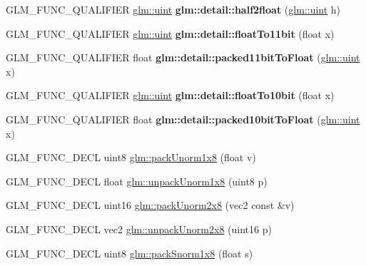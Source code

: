 \begin{DoxyCompactItemize}
G\+L\+M\+\_\+\+F\+U\+N\+C\+\_\+\+Q\+U\+A\+L\+I\+F\+I\+ER \hyperlink{group__core__precision_ga4fd29415871152bfb5abd588334147c8}{glm\+::uint} {\bfseries glm\+::detail\+::half2float} (\hyperlink{group__core__precision_ga4fd29415871152bfb5abd588334147c8}{glm\+::uint} h)
\item 
\mbox{\label{packing_8inl_a62edbdbe89fe6282dd7909e6e4703796}} 
G\+L\+M\+\_\+\+F\+U\+N\+C\+\_\+\+Q\+U\+A\+L\+I\+F\+I\+ER \hyperlink{group__core__precision_ga4fd29415871152bfb5abd588334147c8}{glm\+::uint} {\bfseries glm\+::detail\+::float\+To11bit} (float x)
\item 
\mbox{\label{packing_8inl_a0148d59bbb6dbf6c0f296e73a527c225}} 
G\+L\+M\+\_\+\+F\+U\+N\+C\+\_\+\+Q\+U\+A\+L\+I\+F\+I\+ER float {\bfseries glm\+::detail\+::packed11bit\+To\+Float} (\hyperlink{group__core__precision_ga4fd29415871152bfb5abd588334147c8}{glm\+::uint} x)
\item 
\mbox{\label{packing_8inl_a2be3138712a0811602a183614221ad5c}} 
G\+L\+M\+\_\+\+F\+U\+N\+C\+\_\+\+Q\+U\+A\+L\+I\+F\+I\+ER \hyperlink{group__core__precision_ga4fd29415871152bfb5abd588334147c8}{glm\+::uint} {\bfseries glm\+::detail\+::float\+To10bit} (float x)
\item 
\mbox{\label{packing_8inl_afddea7fa02b61b01129777a21380edf4}} 
G\+L\+M\+\_\+\+F\+U\+N\+C\+\_\+\+Q\+U\+A\+L\+I\+F\+I\+ER float {\bfseries glm\+::detail\+::packed10bit\+To\+Float} (\hyperlink{group__core__precision_ga4fd29415871152bfb5abd588334147c8}{glm\+::uint} x)
\item 
G\+L\+M\+\_\+\+F\+U\+N\+C\+\_\+\+D\+E\+CL uint8 \hyperlink{group__gtc__packing_ga2f9963e5d762b10085b280d3662017ba}{glm\+::pack\+Unorm1x8} (float v)
\item 
G\+L\+M\+\_\+\+F\+U\+N\+C\+\_\+\+D\+E\+CL float \hyperlink{group__gtc__packing_ga32f3f2642df2ea87449d59fb614a8305}{glm\+::unpack\+Unorm1x8} (uint8 p)
\item 
G\+L\+M\+\_\+\+F\+U\+N\+C\+\_\+\+D\+E\+CL uint16 \hyperlink{group__gtc__packing_ga833288fc0d4a79f19d0db75a6843bfe6}{glm\+::pack\+Unorm2x8} (vec2 const \&v)
\item 
G\+L\+M\+\_\+\+F\+U\+N\+C\+\_\+\+D\+E\+CL vec2 \hyperlink{group__gtc__packing_ga96ce0c24339ee676e28a027fffd1edf6}{glm\+::unpack\+Unorm2x8} (uint16 p)
\item 
G\+L\+M\+\_\+\+F\+U\+N\+C\+\_\+\+D\+E\+CL uint8 \hyperlink{group__gtc__packing_ga26b6cd7a35c46c4b6a342f3b97b47423}{glm\+::pack\+Snorm1x8} (float s)

\end{DoxyCompactItemize}
